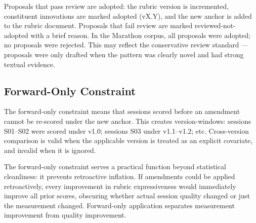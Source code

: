 Proposals that pass review are adopted: the rubric version is incremented, constituent
innovations are marked adopted (vX.Y), and the new anchor is added to the rubric
document. Proposals that fail review are marked reviewed-not-adopted with a brief
reason. In the Marathon corpus, all proposals were adopted; no proposals were
rejected. This may reflect the conservative review standard --- proposals were only
drafted when the pattern was clearly novel and had strong textual evidence.

\subsection{Forward-Only Constraint}

The forward-only constraint means that sessions scored before an amendment cannot be
re-scored under the new anchor. This creates version-windows: sessions S01--S02
were scored under v1.0; sessions S03 under v1.1--v1.2; etc. Cross-version comparison
is valid when the applicable version is treated as an explicit covariate, and invalid
when it is ignored.

The forward-only constraint serves a practical function beyond statistical cleanliness:
it prevents retroactive inflation. If amendments could be applied retroactively, every
improvement in rubric expressiveness would immediately improve all prior scores,
obscuring whether actual session quality changed or just the measurement changed.
Forward-only application separates measurement improvement from quality improvement.
